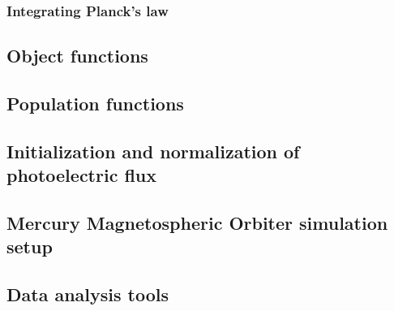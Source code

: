 \subsubsection{Integrating Planck's law}
\subsection{Object functions}
\subsection{Population functions}
\subsection{Initialization and normalization of photoelectric flux}
\subsection{Mercury Magnetospheric Orbiter simulation setup}
\subsection{Data analysis tools}